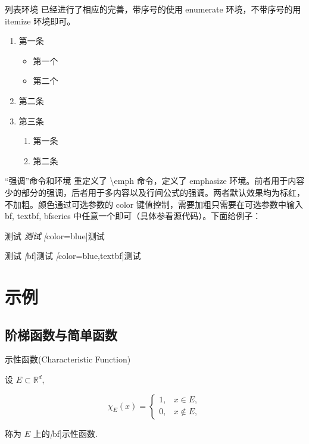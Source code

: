 \documentclass{tingtao-beamer}
\begin{document}
\begin{frame}{列表环境}
  已经进行了相应的完善，带序号的使用 enumerate 环境，不带序号的用 itemize 环境即可。
  \begin{enumerate}
    \item 第一条
      \begin{itemize}
        \item 第一个
        \item 第二个
      \end{itemize}
    \item 第二条
    \item 第三条
      \begin{enumerate}
        \item 第一条
        \item 第二条
      \end{enumerate}
  \end{enumerate}
\end{frame}

\begin{frame}{“强调”命令和环境}
  重定义了 \textbackslash emph 命令，定义了 emphasize 环境。前者用于内容少的部分的强调，后者用于多内容以及行间公式的强调。两者默认效果均为标红，不加粗。颜色通过可选参数的 color 键值控制，需要加粗只需要在可选参数中输入 bf, textbf, bfseries 中任意一个即可（具体参看源代码）。下面给例子：

  测试 \emph{测试} \emph[color=blue]{测试}

  测试 \emph[bf]{测试} \emph[color=blue,textbf]{测试}
\end{frame}


\section{示例}

\subsection{阶梯函数与简单函数}

\begin{frame}{示性函数(Characteristic Function)}
\begin{definition}
  设 $E\subset \mathbb{R}^d$,
    \begin{emphasize}
      \[
        \chi_{E}(x)=
          \begin{cases}
          1,& x\in E,\\
          0,& x\notin E,
          \end{cases}
      \]
    \end{emphasize}
  称为 $E$ 上的\emph[bf]{示性函数}.
\end{definition}
\end{frame}
\end{document}
